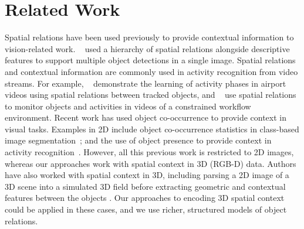 \documentclass[letterpaper]{article}
\begin{document}
\section{Related Work}
\label{sec:Related Work}



Spatial relations have been used previously to provide contextual information to vision-related work. \citeauthor{MyungJin:CVPR2010}~ used a hierarchy of spatial relations alongside descriptive features to support multiple object detections in a single image. Spatial relations and contextual information are commonly used in activity recognition from video streams. For example, \citeauthor{Krishna:ECAI2010}~ demonstrate the learning of activity phases in airport videos using spatial relations between tracked objects, and \citeauthor{Behera2012}~ use spatial relations to monitor objects and activities in videos of a constrained workflow environment. Recent work has used object co-occurrence to provide context in visual  tasks. Examples in 2D include object co-occurrence statistics in class-based image segmentation~\cite{Ladicky:IJCV2013}; and the use of object presence to provide context in activity recognition~\cite{Li:2012}. However, all this previous work is restricted to 2D images, whereas our approaches work with spatial context in 3D (RGB-D) data. Authors have also worked with spatial context in 3D, including parsing a 2D image of a 3D scene into a simulated 3D field before extracting geometric and contextual features between the objects \cite{Xiao:SIGGRAPH2012}. Our approaches to encoding 3D spatial context could be applied in these cases, and we use richer, structured models of object relations.
\end{document}
